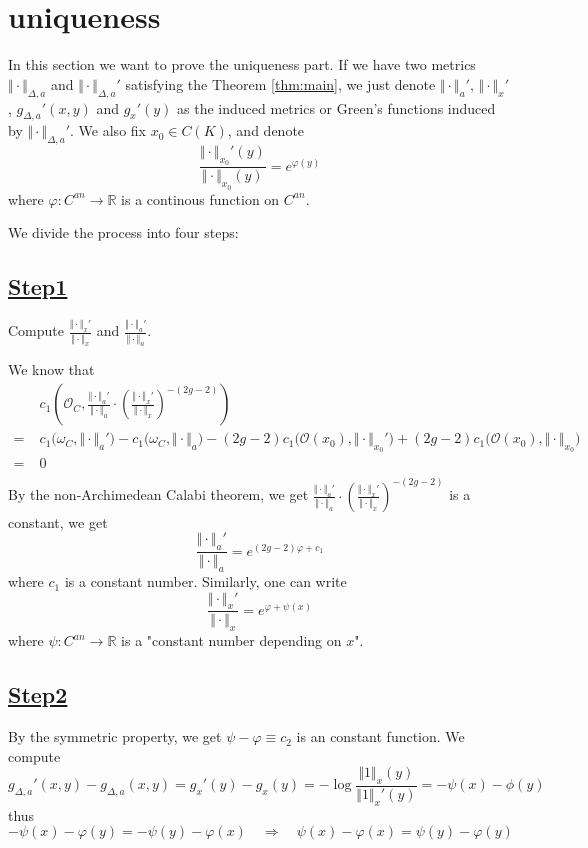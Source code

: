 \documentclass[reqno,11pt]{amsart}
\numberwithin{equation}{section}
\theoremstyle{plain}
\theoremstyle{plain}
\numberwithin{equation}{section}
\theoremstyle{remark}
\newcommand{\norm}[1]{\Vert{#1}\Vert}
\begin{document}
\section{uniqueness}
In this section we want to prove the uniqueness part. If we have two metrics $\norm{\cdot}_{\Delta,a}$ and $\norm{\cdot}_{\Delta,a}'$ satisfying the Theorem \ref{thm:main}, we just denote $\norm{\cdot}_a'$, $\norm{\cdot}_x'$, $g_{\Delta,a}'(x,y)$ and $g_x'(y)$ as the induced metrics or Green's functions induced by $\norm{\cdot}_{\Delta,a}'$. We also fix $x_0 \in C(K)$, and denote 
$$\frac{\norm{\cdot}_{x_0}'(y)}{\norm{\cdot}_{x_0}(y)}=e^{\varphi(y)}$$
where $\varphi:C^{an} \longrightarrow \mathbb{R}$ is a continous function on $C^{an}$.

We divide the process into four steps:
\subsection*{\underline{Step1}}
Compute $\displaystyle\frac{\norm{\cdot}_x'}{\norm{\cdot}_x}$ and $\displaystyle \frac{\norm{\cdot}_a'}{\norm{\cdot}_a}$.

We know that 
\begin{equation*}
\begin{aligned}
&c_1\left(\mathcal{O}_C,\frac{\norm{\cdot}_a'}{\norm{\cdot}_a} \cdot \left(\frac{\norm{\cdot}_x'}{\norm{\cdot}_x} \right)^{-(2g-2)}\right)\\
  =\;&c_1\Big(\omega_C,\norm{\cdot}_a'\Big)-c_1\Big(\omega_C,\norm{\cdot}_a\Big)-(2g-2)c_1\Big(\mathcal{O}(x_0),\norm{\cdot}_{x_0}'\Big)+ (2g-2)c_1\Big(\mathcal{O}(x_0),\norm{\cdot}_{x_0}\Big) \\
    =\;& 0  \\ 
\end{aligned}
\end{equation*}
By the non-Archimedean Calabi theorem, we get $\displaystyle \frac{\norm{\cdot}_a'}{\norm{\cdot}_a} \cdot \left(\frac{\norm{\cdot}_x'}{\norm{\cdot}_x} \right)^{-(2g-2)}$ is a constant, we get
$$\frac{\norm{\cdot}_a'}{\norm{\cdot}_a}=e^{(2g-2)\varphi+c_1}$$
where $c_1$ is a constant number. Similarly, one can write
$$\frac{\norm{\cdot}_x'}{\norm{\cdot}_x}=e^{\varphi+\psi(x)}$$
where $\psi:C^{an} \longrightarrow \mathbb{R}$ is a "constant number depending on $x$".
\subsection*{\underline{Step2}}
By the symmetric property, we get $\psi-\varphi\equiv c_2$ is an constant function. We compute
$$
  g_{\Delta,a}'(x,y)-g_{\Delta,a}(x,y)= g_x'(y)-g_x(y)   =-\log \frac{\norm{1}_x(y)}{\norm{1}_x'(y)}=-\psi(x)-\phi(y)
$$
thus
$$-\psi(x)-\varphi(y)=-\psi(y)-\varphi(x) \quad\Longrightarrow\quad \psi(x)-\varphi(x)=\psi(y)-\varphi(y)$$
\end{document}
